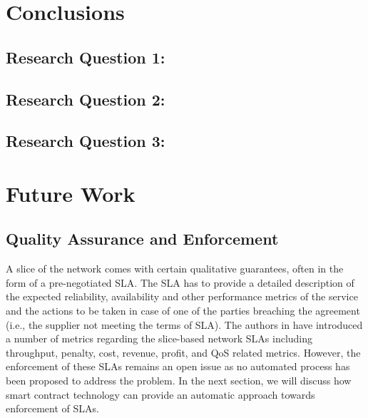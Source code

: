 \section{Conclusions}
\subsection{Research Question 1:}
\subsection{Research Question 2:}
\subsection{Research Question 3:}
\section{Future Work}



\subsection{Quality Assurance and Enforcement}
A slice of the network comes with certain qualitative guarantees, often in the form of a pre-negotiated \ac{SLA}. The \ac{SLA} has to provide a detailed description of the expected reliability, availability and other performance metrics of the service and the actions to be taken in case of one of the parties breaching the agreement (i.e., the supplier not meeting the terms of SLA). The authors in \cite{SLA-Slicing} have introduced a number of metrics regarding the slice-based network \acp{SLA} including throughput, penalty, cost, revenue, profit, and QoS related metrics. However, the enforcement of these \acp{SLA} remains an open issue as no automated process has been proposed to address the problem. In the next section, we will discuss how smart contract technology can provide an automatic approach towards enforcement of \acp{SLA}.